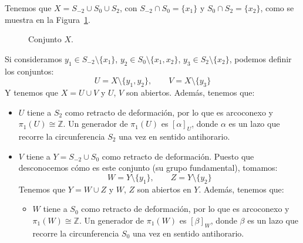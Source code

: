 \begin{ejercicio}
\begin{enumerate}[label=\alph*)]
            Tenemos que $X= S_{-2}\cup S_0\cup S_2$, con $S_{-2}\cap S_0 = \{x_1\}$ y $S_0\cap S_2 = \{x_2\}$, como se muestra en la Figura~\ref{fig:conjuntoX_G}.
            \begin{figure}[h]
                \centering
            \caption{Conjunto $X$.}
            \label{fig:conjuntoX_G}
            \end{figure}
            Si consideramos $y_1\in S_{-2}\setminus \{x_1\}$, $y_2\in S_0\setminus\{x_1,x_2\}$, $y_3\in S_2\setminus \{x_2\}$, podemos definir los conjuntos:
            \begin{equation*}
                U = X\setminus \{y_1,y_2\}, \qquad V = X\setminus \{y_3\}
            \end{equation*}
            Y tenemos que $X=U\cup V$ y $U$, $V$ son abiertos. Además, tenemos que:
            \begin{itemize}
                \item $U$ tiene a $S_2$ como retracto de deformación, por lo que es arcoconexo y  $\pi_1(U)\cong \mathbb{Z}$. Un generador de $\pi_1(U)$ es $[\alpha]_U$, donde $\alpha$ es un lazo que recorre la circunferencia $S_2$ una vez en sentido antihorario.
                \item $V$ tiene a $Y = S_{-2}\cup S_0$ como retracto de deformación. Puesto que desconocemos cómo es este conjunto (su grupo fundamental), tomamos:
                \begin{equation*}
                    W = Y\setminus \{y_1\}, \qquad Z = Y\setminus \{y_2\}
                \end{equation*}
                Tenemos que $Y=W\cup Z$ y $W$, $Z$ son abiertos en $Y$. Además, tenemos que:
                \begin{itemize}
                    \item $W$ tiene a $S_0$ como retracto de deformación, por lo que es arcoconexo y $\pi_1(W)\cong \mathbb{Z}$. Un generador de $\pi_1(W)$ es $[\beta]_W$, donde $\beta$ es un lazo que recorre la circunferencia $S_0$ una vez en sentido antihorario.

\end{itemize}
\end{itemize}
\end{enumerate}
\end{ejercicio}
